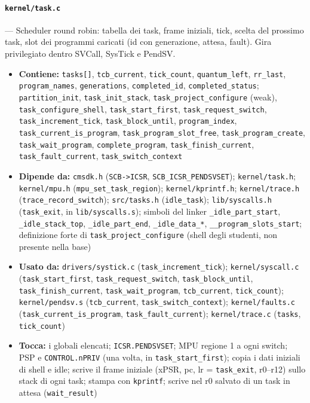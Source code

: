 \paragraph{\texttt{kernel/task.c}} --- Scheduler round robin: tabella dei task, frame iniziali, tick, scelta del prossimo task, slot dei programmi caricati (id con generazione, attesa, fault). Gira privilegiato dentro SVCall, SysTick e PendSV.
\begin{itemize}
  \item \textbf{Contiene:} \texttt{tasks[]}, \texttt{tcb\_current}, \texttt{tick\_count}, \texttt{quantum\_left}, \texttt{rr\_last}, \texttt{program\_names}, \texttt{generations}, \texttt{completed\_id}, \texttt{completed\_status}; \texttt{partition\_init}, \texttt{task\_init\_stack}, \texttt{task\_project\_configure} (weak), \texttt{task\_configure\_shell}, \texttt{task\_start\_first}, \texttt{task\_request\_switch}, \texttt{task\_increment\_tick}, \texttt{task\_block\_until}, \texttt{program\_index}, \texttt{task\_current\_is\_program}, \texttt{task\_program\_slot\_free}, \texttt{task\_program\_create}, \texttt{task\_wait\_program}, \texttt{complete\_program}, \texttt{task\_finish\_current}, \texttt{task\_fault\_current}, \texttt{task\_switch\_context}
  \item \textbf{Dipende da:} \texttt{cmsdk.h} (\texttt{SCB->ICSR}, \texttt{SCB\_ICSR\_PENDSVSET}); \texttt{kernel/task.h}; \texttt{kernel/mpu.h} (\texttt{mpu\_set\_task\_region}); \texttt{kernel/kprintf.h}; \texttt{kernel/trace.h} (\texttt{trace\_record\_switch}); \texttt{src/tasks.h} (\texttt{idle\_task}); \texttt{lib/syscalls.h} (\texttt{task\_exit}, in \texttt{lib/syscalls.s}); simboli del linker \texttt{\_idle\_part\_start}, \texttt{\_idle\_stack\_top}, \texttt{\_idle\_part\_end}, \texttt{\_idle\_data\_*}, \texttt{\_\_program\_slots\_start}; definizione forte di \texttt{task\_project\_configure} (shell degli studenti, non presente nella base)
  \item \textbf{Usato da:} \texttt{drivers/systick.c} (\texttt{task\_increment\_tick}); \texttt{kernel/syscall.c} (\texttt{task\_start\_first}, \texttt{task\_request\_switch}, \texttt{task\_block\_until}, \texttt{task\_finish\_current}, \texttt{task\_wait\_program}, \texttt{tcb\_current}, \texttt{tick\_count}); \texttt{kernel/pendsv.s} (\texttt{tcb\_current}, \texttt{task\_switch\_context}); \texttt{kernel/faults.c} (\texttt{task\_current\_is\_program}, \texttt{task\_fault\_current}); \texttt{kernel/trace.c} (\texttt{tasks}, \texttt{tick\_count})
  \item \textbf{Tocca:} i globali elencati; \texttt{ICSR.PENDSVSET}; MPU regione 1 a ogni switch; PSP e \texttt{CONTROL.nPRIV} (una volta, in \texttt{task\_start\_first}); copia i dati iniziali di shell e idle; scrive il frame iniziale (xPSR, pc, lr = \texttt{task\_exit}, r0--r12) sullo stack di ogni task; stampa con \texttt{kprintf}; scrive nel r0 salvato di un task in attesa (\texttt{wait\_result})
\end{itemize}

